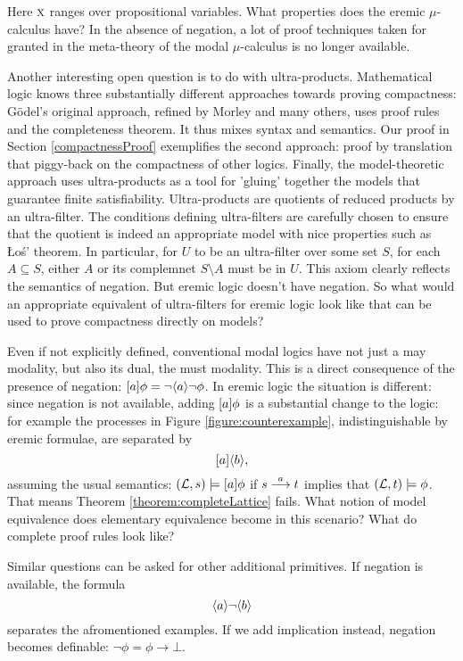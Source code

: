 \NI Here $\text{\textsc{x}}$ ranges over propositional variables. What
properties does the eremic $\mu$-calculus have? In the absence of
negation, a lot of proof techniques taken for granted in the
meta-theory of the modal $\mu$-calculus is no longer available.

Another interesting open question is to do with
ultra-products. Mathematical logic knows three substantially different
approaches towards proving compactness: G\"odel's original approach,
refined by Morley and many others, uses proof rules and the
completeness theorem. It thus mixes syntax and semantics. Our proof in
Section \ref{compactnessProof} exemplifies the second approach: proof
by translation that piggy-back on the compactness of other
logics. Finally, the model-theoretic approach uses ultra-products as a
tool for 'gluing' together the models that guarantee finite
satisfiability. Ultra-products are quotients of reduced products by an
ultra-filter. The conditions defining ultra-filters are carefully
chosen to ensure that the quotient is indeed an appropriate model with
nice properties such as \L{}o\'{s}' theorem. In particular, for $U$ to
be an ultra-filter over some set $S$, for each $A \subseteq S$, either
$A$ or its complemnet $S\setminus A$ must be in $U$. This axiom
clearly reflects the semantics of negation. But eremic logic doesn't
have negation. So what would an appropriate equivalent of
ultra-filters for eremic logic look like that can be used to prove
compactness directly on models?

Even if not explicitly defined, conventional modal logics have not
just a may modality, but also its dual, the must modality. This is a
direct consequence of the presence of negation: $[ a ] \phi = \neg
\langle a \rangle \neg \phi$. In eremic logic the situation is different: since
negation is not available, adding $[ a ] \phi$ is a substantial
change to the logic: for example the processes in Figure
\ref{figure:counterexample}, indistinguishable by eremic formulae, are
separated by
  \[
     [ a ] \langle b \rangle,
  \]
  assuming the usual semantics: $(\mathcal{L}, s) \models [ a ] \phi$ if
  $s \stackrel{a}{\longrightarrow} t$ implies that $(\mathcal{L}, t) \models \phi$. That means
  Theorem \ref{theorem:completeLattice} fails. What notion of model
  equivalence does elementary equivalence become in this scenario?
  What do complete proof rules look like?

  Similar questions can be asked for other additional primitives. If negation is 
  available, the formula
  \[
     \langle a \rangle \neg \langle b \rangle
  \]
  separates the afromentioned examples. If we add implication instead,
  negation becomes definable: $\neg \phi = \phi \rightarrow \bot$.




